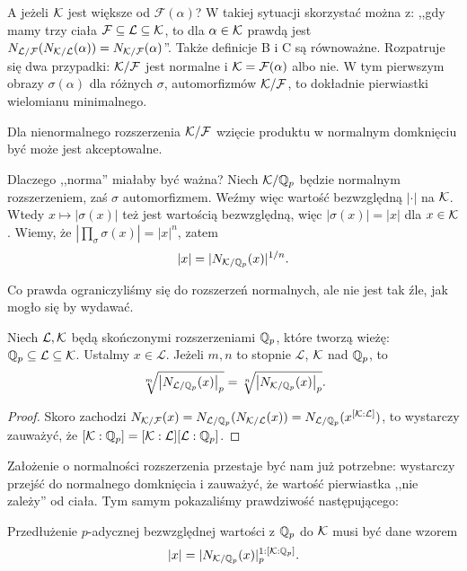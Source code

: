 A jeżeli $\mathcal K$ jest większe od $\mathcal F(\alpha)$?
W takiej sytuacji skorzystać można z: ,,gdy mamy trzy ciała $\mathcal F \subseteq \mathcal L \subseteq \mathcal K$, to dla $\alpha \in \mathcal K$ prawdą jest $N_{\mathcal L / \mathcal F}(N_{\mathcal K / \mathcal L} (\alpha)) = N_{\mathcal K / \mathcal F}(\alpha)$''.
Także definicje B i C są równoważne.
Rozpatruje się dwa przypadki: $\mathcal K / \mathcal F$ jest normalne i $\mathcal K = \mathcal F(\alpha)$ albo nie.
W tym pierwszym obrazy $\sigma(\alpha)$ dla różnych $\sigma$, automorfizmów $\mathcal K/ \mathcal F$, to dokładnie pierwiastki wielomianu minimalnego.

Dla nienormalnego rozszerzenia $\mathcal K / \mathcal F$ wzięcie produktu w normalnym domknięciu być może jest akceptowalne. 

Dlaczego ,,norma'' miałaby być ważna?
Niech $\mathcal K / \mathbb Q_p$ będzie normalnym rozszerzeniem, zaś $\sigma$ automorfizmem.
Weźmy więc wartość bezwzględną $|\cdot|$ na $\mathcal K$.
Wtedy $x \mapsto |\sigma(x)|$ też jest wartością bezwzględną, więc $|\sigma(x)| = |x|$ dla $x \in \mathcal K$.
Wiemy, że $|\prod_\sigma \sigma(x)| = |x|^n$, zatem
\[
	|x| = |N_{\mathcal K / \mathbb Q_p}(x)|^{1/n}.
\]

Co prawda ograniczyliśmy się do rozszerzeń normalnych, ale nie jest tak źle, jak mogło się by wydawać.

\begin{lemat}
	Niech $\mathcal L, \mathcal K$ będą skończonymi rozszerzeniami $\mathbb Q_p$, które tworzą wieżę: $\mathbb Q_p \subseteq \mathcal L \subseteq \mathcal K$.
	Ustalmy $x \in \mathcal L$.
	Jeżeli $m, n$ to stopnie $\mathcal L$, $\mathcal K$ nad $\mathbb Q_p$, to
	\[
		\sqrt[m]{\left|N_{\mathcal L / \mathbb Q_p} (x) \right|_p} = \sqrt[n]{\left|N_{\mathcal K / \mathbb Q_p} (x) \right|_p}.
	\]
\end{lemat}

\begin{proof}
	Skoro zachodzi $N_{\mathcal K/\mathcal F}(x) = N_{\mathcal L/\mathbb Q_p} (N_{\mathcal K/\mathcal L}(x)) = N_{\mathcal L/\mathbb Q_p} (x^{[\mathcal K: \mathcal L]})$, to wystarczy zauważyć, że $[\mathcal K:\mathbb Q_p] = [\mathcal K  :\mathcal L][\mathcal L : \mathbb Q_p]$.
\end{proof}

Założenie o normalności rozszerzenia przestaje być nam już potrzebne: wystarczy przejść do normalnego domknięcia i zauważyć, że wartość pierwiastka ,,nie zależy'' od ciała.
Tym samym pokazaliśmy prawdziwość następującego:

\begin{fakt}
	Przedłużenie $p$-adycznej bezwzględnej wartości z $\mathbb Q_p$ do $\mathcal K$ musi być dane wzorem
	\[
		|x| = |N_{\mathcal K/ \mathbb Q_p}(x)|_p^{1 : [\mathcal K : \mathbb Q_p]}.
	\]
\end{fakt}

